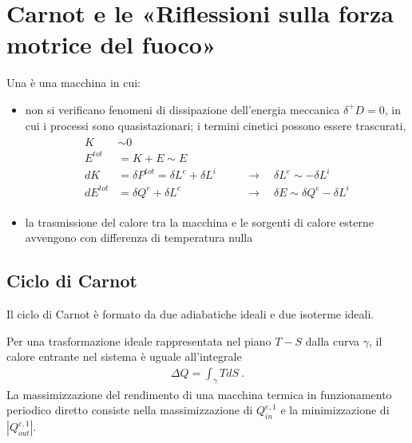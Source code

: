 \documentclass[letterpaper,10pt,italian]{jupyterBook}
\begin{document}
\section{Carnot e le «Riflessioni sulla forza motrice del fuoco»}
\label{\detokenize{ch/thermodynamics/heat-engine-carnot:carnot-e-le-riflessioni-sulla-forza-motrice-del-fuoco}}\label{\detokenize{ch/thermodynamics/heat-engine-carnot:physics-hs-thermodynamics-heat-engine-carnot}}\label{\detokenize{ch/thermodynamics/heat-engine-carnot::doc}}
\sphinxAtStartPar
Una  è una macchina in cui:
\begin{itemize}
\item {} 
\sphinxAtStartPar
non si verificano fenomeni di dissipazione dell’energia meccanica \(\delta^+ D = 0\), in cui i processi sono quasi\sphinxhyphen{}stazionari; i termini cinetici possono essere trascurati,
\begin{equation*}
\begin{split}\begin{aligned}
    K & \sim 0 \\
    E^{tot} & = K + E \sim E \\
    d K & = \delta P^{tot} = \delta L^{e} + \delta L^{i} & & \quad \rightarrow \quad \delta L^{e} \sim - \delta L^i \\
    d E^{tot} & = \delta Q^{e} + \delta L^e              & & \quad \rightarrow \quad \delta E \sim \delta Q^{e} - \delta L^i
  \end{aligned}\end{split}
\end{equation*}
\item {} 
\sphinxAtStartPar
la trasmissione del calore tra la macchina e le sorgenti di calore esterne avvengono con differenza di temperatura nulla

\end{itemize}




\subsection{Ciclo di Carnot}
\label{\detokenize{ch/thermodynamics/heat-engine-carnot:ciclo-di-carnot}}\label{\detokenize{ch/thermodynamics/heat-engine-carnot:physics-hs-thermodynamics-heat-engine-carnot-td-cycle}}
\sphinxAtStartPar
Il ciclo di Carnot è formato da due adiabatiche ideali e due isoterme ideali.

\sphinxAtStartPar
Per una trasformazione ideale rappresentata nel piano \(T-S\) dalla curva \(\gamma\), il calore entrante nel sistema è uguale all’integrale  
\begin{equation*}
\begin{split}\Delta Q = \int_{\gamma} T d S \ .\end{split}
\end{equation*}
\sphinxAtStartPar
La massimizzazione del rendimento di una macchina termica in funzionamento periodico diretto consiste nella massimizzazione di \(Q^{e,1}_{in}\) e la minimizzazione di \(|Q^{e,1}_{out}|\).
\end{document}
